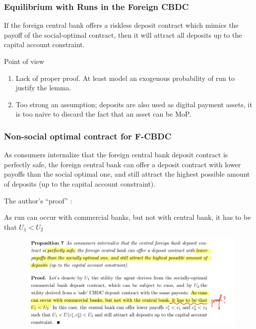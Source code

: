 \begin{frame}
    \frametitle{Equilibrium with Runs in the Foreign CBDC}

    \setcounter{theorem}{5}
    \begin{lemma}
        If the foreign central bank offers a riskless deposit contract which 
        mimics the payoff of the social-optimal contract, then it will attract all deposits 
        up to the capital account constraint.
    \end{lemma}

    \begin{alertblock}{Point of view}
        \begin{enumerate}
            \item Lack of proper proof. At least model an exogenous probability of run to justify the lemma.
            \item Too strong an assumption; deposits are also used as digital payment assets, 
                    it is too naive to discard the fact that an asset can be MoP.
        \end{enumerate}
        
    \end{alertblock}

\end{frame}

\begin{frame}
    \frametitle{Non-social optimal contract for F-CBDC}

    \begin{proposition}
        As consumers internalize that the foreign central bank deposit contract is perfectly safe, 
        the foreign central bank can offer a deposit contract with lower payoffs than the social optimal one, 
        and still attract the highest possible amount of deposits (up to the capital account constraint).
    \end{proposition}

    The author's ``proof'' : 

    As run can occur with commercial banks, but not with central bank, 
    it has to be that $U_1 < U_2$

\end{frame}

\begin{frame}[plain]

    \begin{figure}
        \centering
        \includegraphics[width = \textwidth]{fig/wtf.jpg}
    \end{figure}
\end{frame}